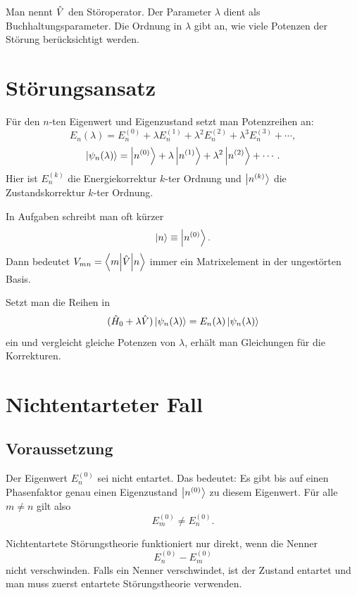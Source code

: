 \begin{definitionbox}
Man nennt \(\hat V\) den Störoperator. Der Parameter \(\lambda\) dient als Buchhaltungsparameter. Die Ordnung in \(\lambda\) gibt an, wie viele Potenzen der Störung berücksichtigt werden.
\end{definitionbox}

\section{Störungsansatz}

Für den \(n\)-ten Eigenwert und Eigenzustand setzt man Potenzreihen an:
\[
    E_n(\lambda)
    = E_n^{(0)}+\lambda E_n^{(1)}+\lambda^2E_n^{(2)}+\lambda^3E_n^{(3)}+\cdots,
\]
\[
    \left|\psi_n(\lambda)\right\rangle
    = \left|n^{(0)}\right\rangle
    +\lambda\left|n^{(1)}\right\rangle
    +\lambda^2\left|n^{(2)}\right\rangle
    +\cdots.
\]
Hier ist \(E_n^{(k)}\) die Energiekorrektur \(k\)-ter Ordnung und \(\left|n^{(k)}\right\rangle\) die Zustandskorrektur \(k\)-ter Ordnung.

\begin{examtipbox}
In Aufgaben schreibt man oft kürzer
\[
    \left|n\right\rangle\equiv \left|n^{(0)}\right\rangle.
\]
Dann bedeutet \(V_{mn}=\left\langle m\middle|\hat V\middle|n\right\rangle\) immer ein Matrixelement in der ungestörten Basis.
\end{examtipbox}

Setzt man die Reihen in
\[
    (\hat H_0+\lambda\hat V)\left|\psi_n(\lambda)\right\rangle
    =E_n(\lambda)\left|\psi_n(\lambda)\right\rangle
\]
ein und vergleicht gleiche Potenzen von \(\lambda\), erhält man Gleichungen für die Korrekturen.

\section{Nichtentarteter Fall}

\subsection{Voraussetzung}

Der Eigenwert \(E_n^{(0)}\) sei nicht entartet. Das bedeutet: Es gibt bis auf einen Phasenfaktor genau einen Eigenzustand \(\left|n^{(0)}\right\rangle\) zu diesem Eigenwert. Für alle \(m\neq n\) gilt also
\[
    E_m^{(0)}\neq E_n^{(0)}.
\]

\begin{conceptbox}
Nichtentartete Störungstheorie funktioniert nur direkt, wenn die Nenner
\[
    E_n^{(0)}-E_m^{(0)}
\]
nicht verschwinden. Falls ein Nenner verschwindet, ist der Zustand entartet und man muss zuerst entartete Störungstheorie verwenden.
\end{conceptbox}


